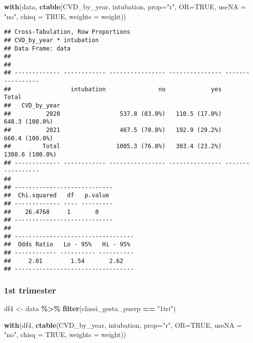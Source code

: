 \documentclass[
]{article}
\newenvironment{Shaded}{\begin{snugshade}}{\end{snugshade}}
\newcommand{\AttributeTok}[1]{\textcolor[rgb]{0.13,0.29,0.53}{#1}}
\newcommand{\ConstantTok}[1]{\textcolor[rgb]{0.56,0.35,0.01}{#1}}
\newcommand{\FunctionTok}[1]{\textcolor[rgb]{0.13,0.29,0.53}{\textbf{#1}}}
\newcommand{\NormalTok}[1]{#1}
\newcommand{\OtherTok}[1]{\textcolor[rgb]{0.56,0.35,0.01}{#1}}
\newcommand{\SpecialCharTok}[1]{\textcolor[rgb]{0.81,0.36,0.00}{\textbf{#1}}}
\newcommand{\StringTok}[1]{\textcolor[rgb]{0.31,0.60,0.02}{#1}}
\begin{document}
\begin{Shaded}
\begin{Highlighting}[]
\FunctionTok{with}\NormalTok{(data, }\FunctionTok{ctable}\NormalTok{(CVD\_by\_year, intubation, }\AttributeTok{prop=}\StringTok{"r"}\NormalTok{, }\AttributeTok{OR=}\ConstantTok{TRUE}\NormalTok{, }\AttributeTok{useNA =} \StringTok{"no"}\NormalTok{, }\AttributeTok{chisq =} \ConstantTok{TRUE}\NormalTok{,  }\AttributeTok{weights =}\NormalTok{ weight))}
\end{Highlighting}
\end{Shaded}

\begin{verbatim}
## Cross-Tabulation, Row Proportions  
## CVD_by_year * intubation  
## Data Frame: data  
## 
## 
## ------------- ------------ ---------------- --------------- -----------------
##                 intubation               no             yes             Total
##   CVD_by_year                                                                
##          2020                 537.8 (83.0%)   110.5 (17.0%)    648.3 (100.0%)
##          2021                 467.5 (70.8%)   192.9 (29.2%)    660.4 (100.0%)
##         Total                1005.3 (76.8%)   303.4 (23.2%)   1308.6 (100.0%)
## ------------- ------------ ---------------- --------------- -----------------
## 
## ----------------------------
##  Chi.squared   df   p.value 
## ------------- ---- ---------
##    26.4768     1       0    
## ----------------------------
## 
## ----------------------------------
##  Odds Ratio   Lo - 95%   Hi - 95% 
## ------------ ---------- ----------
##     2.01        1.54       2.62   
## ----------------------------------
\end{verbatim}

\hypertarget{st-trimester-10}{%
\subsubsection{1st trimester}\label{st-trimester-10}}

\begin{Shaded}
\begin{Highlighting}[]
\NormalTok{df4 }\OtherTok{\textless{}{-}}\NormalTok{ data }\SpecialCharTok{\%\textgreater{}\%} 
  \FunctionTok{filter}\NormalTok{(classi\_gesta\_puerp }\SpecialCharTok{==} \StringTok{"1tri"}\NormalTok{)}

\FunctionTok{with}\NormalTok{(df4, }\FunctionTok{ctable}\NormalTok{(CVD\_by\_year, intubation, }\AttributeTok{prop=}\StringTok{"r"}\NormalTok{, }\AttributeTok{OR=}\ConstantTok{TRUE}\NormalTok{, }\AttributeTok{useNA =} \StringTok{"no"}\NormalTok{, }\AttributeTok{chisq =} \ConstantTok{TRUE}\NormalTok{, }\AttributeTok{weights =}\NormalTok{ weight))}
\end{Highlighting}
\end{Shaded}
\end{document}
